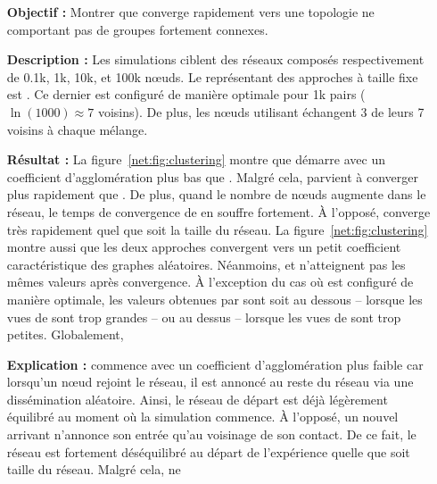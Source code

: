 \begin{itemize}
\item [\textbf{Objectif :}] Montrer que \SPRAY converge rapidement vers une
  topologie ne comportant pas de groupes fortement connexes.
\item [\textbf{Description :}] Les simulations ciblent des réseaux composés
  respectivement de 0.1k, 1k, 10k, et 100k nœuds. Le représentant des approches
  à taille fixe est \CYCLON. Ce dernier est configuré de manière optimale pour
  1k pairs ($\ln(1000)\approx 7$ voisins). De plus, les nœuds utilisant \CYCLON
  échangent 3 de leurs 7 voisins à chaque mélange.
\item [\textbf{Résultat :}] La figure~\ref{net:fig:clustering} montre que
  \CYCLON démarre avec un coefficient d'agglomération plus bas que
  \SPRAY. Malgré cela, \SPRAY parvient à converger plus rapidement que
  \CYCLON. De plus, quand le nombre de nœuds augmente dans le réseau, le temps
  de convergence de \CYCLON en souffre fortement. À l'opposé, \SPRAY converge
  très rapidement quel que soit la taille du réseau. La
  figure~\ref{net:fig:clustering} montre aussi que les deux approches convergent
  vers un petit coefficient caractéristique des graphes aléatoires. Néanmoins,
  \CYCLON et \SPRAY n'atteignent pas les mêmes valeurs après convergence. À
  l'exception du cas où \CYCLON est configuré de manière optimale, les valeurs
  obtenues par \SPRAY sont soit au dessous -- lorsque les vues de \CYCLON sont
  trop grandes -- ou au dessus -- lorsque les vues de \CYCLON sont trop
  petites. Globalement, \SPRAY
\item [\textbf{Explication :}] \CYCLON commence avec un coefficient
  d'agglomération plus faible car lorsqu'un nœud rejoint le réseau, il est
  annoncé au reste du réseau via une dissémination aléatoire. Ainsi, le réseau
  de départ est déjà légèrement équilibré au moment où la simulation commence. À
  l'opposé, un nouvel arrivant \SPRAY n'annonce son entrée qu'au voisinage de
  son contact. De ce fait, le réseau est fortement déséquilibré au départ de
  l'expérience quelle que soit taille du réseau. Malgré cela, \CYCLON ne

\end{itemize}
